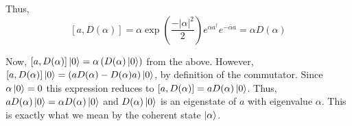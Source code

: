 \begin{homeworkProblem}
   Thus,
   \[
      [a, D(\alpha)] =
      \alpha
      \exp\left(\frac{-\left| \alpha \right|^{2}}{2}\right)
      e^{\alpha a^{\dagger}}
      e^{-\bar{\alpha}a} =
      \alpha D(\alpha)
   \]

   Now, $ \left[ a, D(\alpha) \right] \ket{0} = \alpha \left( D(\alpha)
   \ket{0} \right) $ from the above. However, $ \left[ a, D(\alpha) \right]
   \ket{0} = (a D(\alpha) - D(\alpha) a) \ket{0}$, by definition of the
   commutator. Since $ \alpha \ket{0} = 0 $ this expression reduces to $ \left[
   a, D(\alpha) \right] = a D(\alpha) \ket{0} $. Thus, $ a D(\alpha) \ket{0} =
   \alpha D(\alpha) \ket{0} $ and $ D(\alpha) \ket{0} $ is an eigenstate of $ a $
   with eigenvalue $ \alpha $. This is exactly what we mean by the coherent state $
   \ket{\alpha} $.
\end{homeworkProblem}
